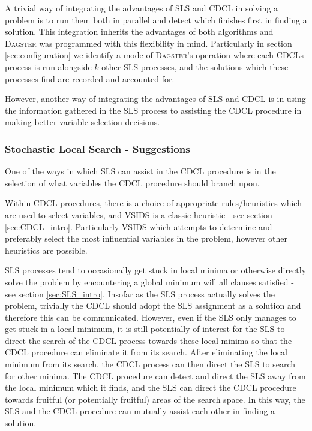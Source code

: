 \documentclass[
10pt, %
a4paper, %
oneside, %
headinclude,footinclude, %
BCOR5mm, %
]{scrartcl}
\begin{document}
A trivial way of integrating the advantages of SLS and CDCL in solving a problem is to run them both in parallel and detect which finishes first in finding a solution.
This integration inherits the advantages of both algorithms and \textsc{Dagster} was programmed with this flexibility in mind.
Particularly in section \ref{sec:configuration} we identify a mode of \textsc{Dagster}'s operation where each CDCLs process is run alongside $k$ other SLS processes, and the solutions which these processes find are recorded and accounted for.

However, another way of integrating the advantages of SLS and CDCL is in using the information gathered in the SLS process to assisting the CDCL procedure in making better variable selection decisions.


\subsubsection{Stochastic Local Search - Suggestions}\label{sec:SLS_suggestions}
One of the ways in which SLS can assist in the CDCL procedure is in the selection of what variables the CDCL procedure should branch upon.

Within CDCL procedures, there is a choice of appropriate rules/heuristics which are used to select variables, and VSIDS is a classic heuristic
 - see section \ref{sec:CDCL_intro}.
Particularly VSIDS which attempts to determine and preferably select the most influential variables in the problem, however other heuristics are possible.

SLS processes tend to occasionally get stuck in local minima or otherwise directly solve the problem by encountering a global minimum will all clauses satisfied - see section \ref{sec:SLS_intro}.
Insofar as the SLS process actually solves the problem, trivially the CDCL should adopt the SLS assignment as a solution and therefore this can be communicated.
However, even if the SLS only manages to get stuck in a local minimum, it is still potentially of interest for the SLS to direct the search of the CDCL process towards these local minima so that the CDCL procedure can eliminate it from its search.
After eliminating the local minimum from its search, the CDCL process can then direct the SLS to search for other minima.
The CDCL procedure can detect and direct the SLS away from the local minimum which it finds, and the SLS can direct the CDCL procedure towards fruitful (or potentially fruitful) areas of the search space.
In this way, the SLS and the CDCL procedure can mutually assist each other in finding a solution.
\end{document}
